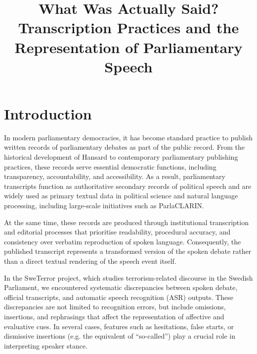 \documentclass[10pt, a4paper]{article}
\title{What Was Actually Said? Transcription Practices and the Representation of Parliamentary Speech}
\begin{document}
\maketitleabstract

\section{Introduction}

In modern parliamentary democracies, it has become standard practice to publish written records of parliamentary debates as part of the public record.
From the historical development of Hansard to contemporary parliamentary publishing practices, these records serve essential democratic functions, including transparency, accountability, and accessibility. As a result, parliamentary transcripts function as authoritative secondary records of political speech and are widely used as primary textual data in political science and natural language processing, including large-scale initiatives such as ParlaCLARIN.

At the same time, these records are produced through institutional transcription and editorial processes that prioritise readability, procedural accuracy, and consistency over verbatim reproduction of spoken language. Consequently, the published transcript represents a transformed version of the spoken debate rather than a direct textual rendering of the speech event itself.

% 

In the SweTerror project, which studies terrorism-related discourse in the Swedish Parliament, we encountered systematic discrepancies between spoken debate, official transcripts, and automatic speech recognition (ASR) outputs. These discrepancies are not limited to recognition errors, but include omissions, insertions, and rephrasings that affect the representation of affective and evaluative cues. In several cases, features such as hesitations, false starts, or dismissive insertions (e.g. the equivalent of ``so-called'') play a crucial role in interpreting speaker stance.

\end{document}
